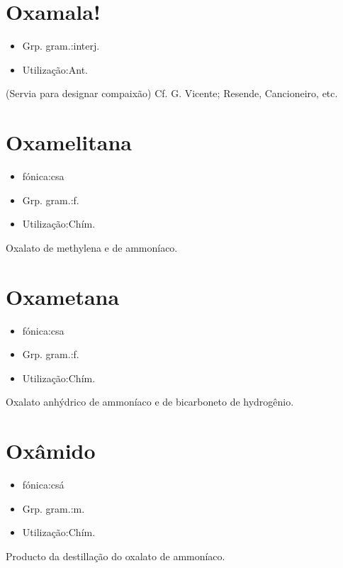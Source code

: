 \section{Oxamala!}
\begin{itemize}
\item {Grp. gram.:interj.}
\end{itemize}
\begin{itemize}
\item {Utilização:Ant.}
\end{itemize}
(Servia para designar \textunderscore compaixão\textunderscore ) Cf. G. Vicente; Resende, \textunderscore Cancioneiro\textunderscore , etc.
\section{Oxamelitana}
\begin{itemize}
\item {fónica:csa}
\end{itemize}
\begin{itemize}
\item {Grp. gram.:f.}
\end{itemize}
\begin{itemize}
\item {Utilização:Chím.}
\end{itemize}
Oxalato de methylena e de ammoníaco.
\section{Oxametana}
\begin{itemize}
\item {fónica:csa}
\end{itemize}
\begin{itemize}
\item {Grp. gram.:f.}
\end{itemize}
\begin{itemize}
\item {Utilização:Chím.}
\end{itemize}
Oxalato anhýdrico de ammoníaco e de bicarboneto de hydrogênio.
\section{Oxâmido}
\begin{itemize}
\item {fónica:csá}
\end{itemize}
\begin{itemize}
\item {Grp. gram.:m.}
\end{itemize}
\begin{itemize}
\item {Utilização:Chím.}
\end{itemize}
Producto da destillação do oxalato de ammoníaco.
